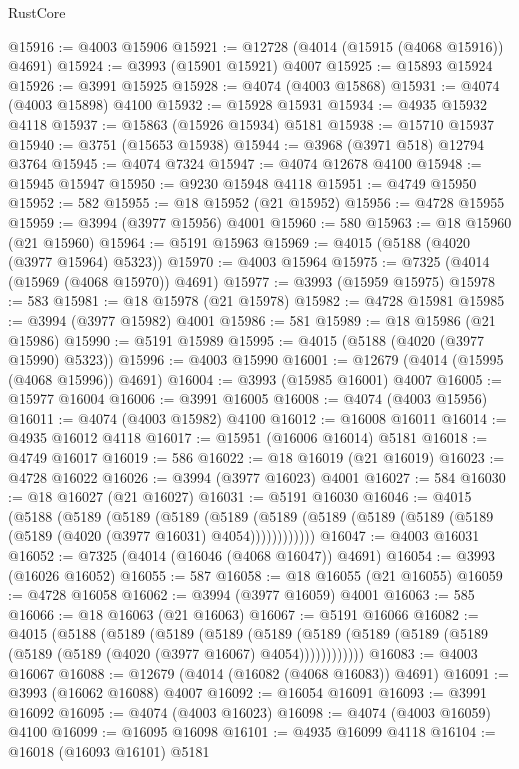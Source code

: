 \begin{lexlean}{RustCore}
\begin{coremodule}
@15916 := @4003 @15906
@15921 := @12728 (@4014 (@15915 (@4068 @15916)) @4691)
@15924 := @3993 (@15901 @15921) @4007
@15925 := @15893 @15924
@15926 := @3991 @15925
@15928 := @4074 (@4003 @15868)
@15931 := @4074 (@4003 @15898) @4100
@15932 := @15928 @15931
@15934 := @4935 @15932 @4118
@15937 := @15863 (@15926 @15934) @5181
@15938 := @15710 @15937
@15940 := @3751 (@15653 @15938)
@15944 := @3968 (@3971 @518) @12794 @3764
@15945 := @4074 @7324
@15947 := @4074 @12678 @4100
@15948 := @15945 @15947
@15950 := @9230 @15948 @4118
@15951 := @4749 @15950
@15952 := 582
@15955 := @18 @15952 (@21 @15952)
@15956 := @4728 @15955
@15959 := @3994 (@3977 @15956) @4001
@15960 := 580
@15963 := @18 @15960 (@21 @15960)
@15964 := @5191 @15963
@15969 := @4015 (@5188 (@4020 (@3977 @15964) @5323))
@15970 := @4003 @15964
@15975 := @7325 (@4014 (@15969 (@4068 @15970)) @4691)
@15977 := @3993 (@15959 @15975)
@15978 := 583
@15981 := @18 @15978 (@21 @15978)
@15982 := @4728 @15981
@15985 := @3994 (@3977 @15982) @4001
@15986 := 581
@15989 := @18 @15986 (@21 @15986)
@15990 := @5191 @15989
@15995 := @4015 (@5188 (@4020 (@3977 @15990) @5323))
@15996 := @4003 @15990
@16001 := @12679 (@4014 (@15995 (@4068 @15996)) @4691)
@16004 := @3993 (@15985 @16001) @4007
@16005 := @15977 @16004
@16006 := @3991 @16005
@16008 := @4074 (@4003 @15956)
@16011 := @4074 (@4003 @15982) @4100
@16012 := @16008 @16011
@16014 := @4935 @16012 @4118
@16017 := @15951 (@16006 @16014) @5181
@16018 := @4749 @16017
@16019 := 586
@16022 := @18 @16019 (@21 @16019)
@16023 := @4728 @16022
@16026 := @3994 (@3977 @16023) @4001
@16027 := 584
@16030 := @18 @16027 (@21 @16027)
@16031 := @5191 @16030
@16046 := @4015
    (@5188
      (@5189
        (@5189
          (@5189
            (@5189 (@5189 (@5189 (@5189 (@5189 (@5189 (@5189 (@4020 (@3977 @16031) @4054))))))))))))
@16047 := @4003 @16031
@16052 := @7325 (@4014 (@16046 (@4068 @16047)) @4691)
@16054 := @3993 (@16026 @16052)
@16055 := 587
@16058 := @18 @16055 (@21 @16055)
@16059 := @4728 @16058
@16062 := @3994 (@3977 @16059) @4001
@16063 := 585
@16066 := @18 @16063 (@21 @16063)
@16067 := @5191 @16066
@16082 := @4015
    (@5188
      (@5189
        (@5189
          (@5189
            (@5189 (@5189 (@5189 (@5189 (@5189 (@5189 (@5189 (@4020 (@3977 @16067) @4054))))))))))))
@16083 := @4003 @16067
@16088 := @12679 (@4014 (@16082 (@4068 @16083)) @4691)
@16091 := @3993 (@16062 @16088) @4007
@16092 := @16054 @16091
@16093 := @3991 @16092
@16095 := @4074 (@4003 @16023)
@16098 := @4074 (@4003 @16059) @4100
@16099 := @16095 @16098
@16101 := @4935 @16099 @4118
@16104 := @16018 (@16093 @16101) @5181

\end{coremodule}
\end{lexlean}
